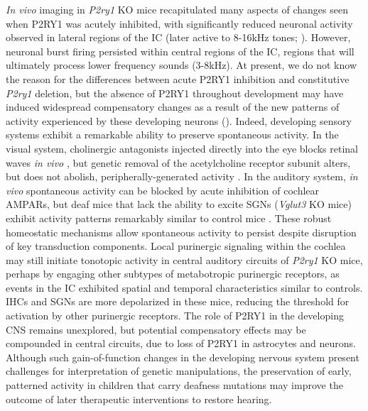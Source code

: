 \documentclass[9pt,lineno]{elife}
\begin{document}
\textit{In vivo} imaging in \textit{P2ry1} KO mice recapitulated many aspects of changes seen when P2RY1 was acutely inhibited, with significantly reduced neuronal activity observed in lateral regions of the IC (later active to 8-16kHz tones; ). However, neuronal burst firing persisted within central regions of the IC, regions that will ultimately process lower frequency sounds (3-8kHz). At present, we do not know the reason for the differences between acute P2RY1 inhibition and constitutive \textit{P2ry1} deletion, but the absence of P2RY1 throughout development may have induced widespread compensatory changes as a result of the new patterns of activity experienced by these developing neurons (). Indeed, developing sensory systems exhibit a remarkable ability to preserve spontaneous activity. In the visual system, cholinergic antagonists injected directly into the eye blocks retinal waves \textit{in vivo} \citep{Ackman2012}, but genetic removal of the  acetylcholine receptor subunit alters, but does not abolish, peripherally-generated activity \citep{Zhang2012}. In the auditory system, \textit{in vivo} spontaneous activity can be blocked by acute inhibition of cochlear AMPARs, but deaf mice that lack the ability to excite SGNs (\textit{Vglut3} KO mice) exhibit activity patterns remarkably similar to control mice \citep{Babola2018}. These robust homeostatic mechanisms allow spontaneous activity to persist despite disruption of key transduction components. Local purinergic signaling within the cochlea may still initiate tonotopic activity in central auditory circuits of \textit{P2ry1} KO mice, perhaps by engaging other subtypes of metabotropic purinergic receptors, as events in the IC exhibited spatial and temporal characteristics similar to controls. IHCs and SGNs are more depolarized in these mice, reducing the threshold for activation by other purinergic receptors. The role of P2RY1 in the developing CNS remains unexplored, but potential compensatory effects may be compounded in central circuits, due to loss of P2RY1 in astrocytes and neurons. Although such gain-of-function changes in the developing nervous system present challenges for interpretation of genetic manipulations, the preservation of early, patterned activity in children that carry deafness mutations may improve the outcome of later therapeutic interventions to restore hearing. 
\end{document}
